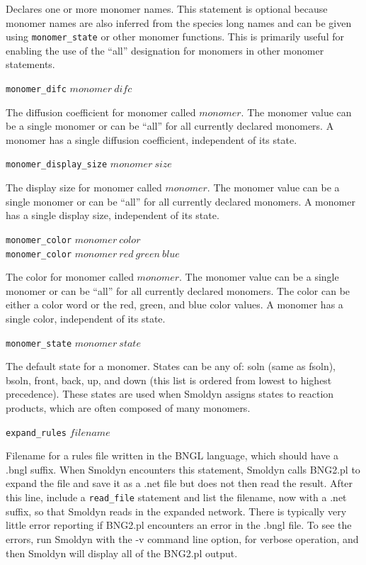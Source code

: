 \documentclass {book}
\newcommand {\ttt} {\texttt}
\begin{document}
\begin{description}
Declares one or more monomer names. This statement is optional because monomer names are also inferred from the species long names and can be given using \ttt{monomer\_state} or other monomer functions. This is primarily useful for enabling the use of the ``all'' designation for monomers in other monomer statements.

\item{\ttt{monomer\_difc} $monomer\ difc$}

The diffusion coefficient for monomer called $monomer$. The monomer value can be a single monomer or can be ``all'' for all currently declared monomers. A monomer has a single diffusion coefficient, independent of its state.

\item{\ttt{monomer\_display\_size} $monomer\ size$}

The display size for monomer called $monomer$. The monomer value can be a single monomer or can be ``all'' for all currently declared monomers. A monomer has a single display size, independent of its state.

\item{\ttt{monomer\_color} $monomer\ color$\\
\ttt{monomer\_color} $monomer\ red\ green\ blue$}

The color for monomer called $monomer$. The monomer value can be a single monomer or can be ``all'' for all currently declared monomers. The color can be either a color word or the red, green, and blue color values. A monomer has a single color, independent of its state.

\item{\ttt{monomer\_state} $monomer\ state$}

The default state for a monomer. States can be any of: soln (same as fsoln), bsoln, front, back, up, and down (this list is ordered from lowest to highest precedence). These states are used when Smoldyn assigns states to reaction products, which are often composed of many monomers.

\item{\ttt{expand\_rules} $filename$}

Filename for a rules file written in the BNGL language, which should have a .bngl suffix. When Smoldyn encounters this statement, Smoldyn calls BNG2.pl to expand the file and save it as a .net file but does not then read the result. After this line, include a \ttt{read\_file} statement and list the filename, now with a .net suffix, so that Smoldyn reads in the expanded network. There is typically very little error reporting if BNG2.pl encounters an error in the .bngl file. To see the errors, run Smoldyn with the -v command line option, for verbose operation, and then Smoldyn will display all of the BNG2.pl output.

\end{description}
\end{document}
